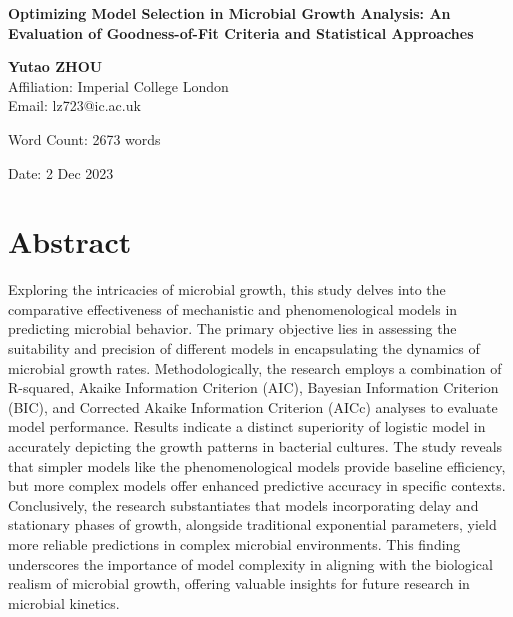 \documentclass[11pt]{article}
\begin{document}
\begin{titlepage}
    \begin{center}
        \vspace*{1cm}
        
        \Large
        \textbf{Optimizing Model Selection in Microbial Growth Analysis: An Evaluation of Goodness-of-Fit Criteria and Statistical Approaches}
        
        \vspace{1.5cm}
        
        \textbf{Yutao ZHOU}\\
        Affiliation: Imperial College London\\
        Email: lz723@ic.ac.uk
        
        \vfill
        
        Word Count: 2673 words
        
        \vspace{0.8cm}
        
        \Large
        Date: 2 Dec 2023
        
    \end{center}
\end{titlepage}

\onehalfspacing
\section{Abstract}
Exploring the intricacies of microbial growth, this study delves into the comparative effectiveness of mechanistic and phenomenological models in predicting microbial behavior. The primary objective lies in assessing the suitability and precision of different models in encapsulating the dynamics of microbial growth rates. Methodologically, the research employs a combination of R-squared, Akaike Information Criterion (AIC), Bayesian Information Criterion (BIC), and Corrected Akaike Information Criterion (AICc) analyses to evaluate model performance. Results indicate a distinct superiority of logistic model in accurately depicting the growth patterns in bacterial cultures. The study reveals that simpler models like the phenomenological models provide baseline efficiency, but more complex models offer enhanced predictive accuracy in specific contexts. Conclusively, the research substantiates that models incorporating delay and stationary phases of growth, alongside traditional exponential parameters, yield more reliable predictions in complex microbial environments. This finding underscores the importance of model complexity in aligning with the biological realism of microbial growth, offering valuable insights for future research in microbial kinetics.
\end{document}
